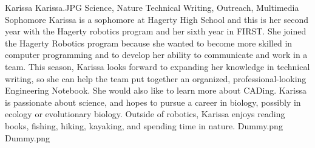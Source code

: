 \insertbio
{Karissa}
{Karissa.JPG}
{Science, Nature}
{Technical Writing, Outreach, Multimedia}
{Sophomore}
{
Karissa is a sophomore at Hagerty High School and this is her second year with the Hagerty robotics program and her sixth year in FIRST. She joined the Hagerty Robotics program because she wanted to become more skilled in computer programming and to develop her ability to communicate and work in a team. This season, Karissa looks forward to expanding her knowledge in technical writing, so she can help the team put together an organized, professional-looking Engineering Notebook. She would also like to learn more about CADing. Karissa is passionate about science, and hopes to pursue a career in biology, possibly in ecology or evolutionary biology. Outside of robotics, Karissa enjoys reading books, fishing, hiking, kayaking, and spending time in nature.
}
{Dummy.png}
{Dummy.png}
